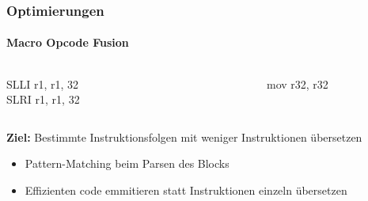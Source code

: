\begin{frame}
	\frametitle{Optimierungen}
	\framesubtitle{Macro Opcode Fusion}
	
	\begin{columns}[onlytextwidth]
		\ttfamily
		\begin{column}{0.45\textwidth}
			\centering
			SLLI r1, r1, 32\\
			SLRI r1, r1, 32
		\end{column}
		
		\begin{column}{0.05\textwidth}
			\centering
			\conclude
		\end{column}
		
		\begin{column}{0.45\textwidth}
			\centering
			mov r32, r32
		\end{column}
	\end{columns}

	\pause

	\vspace{0.5cm}
	
	\textbf{Ziel: } Bestimmte Instruktionsfolgen mit weniger Instruktionen übersetzen
	\pause
	
	\vspace{0.5cm}
	
	\begin{itemize}
		\item Pattern-Matching beim Parsen des Blocks
		\pause
		\item Effizienten code emmitieren statt Instruktionen einzeln übersetzen
	\end{itemize}
\end{frame}

